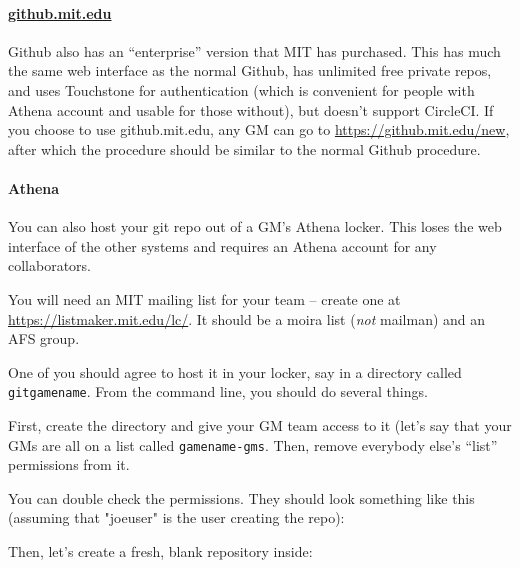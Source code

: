 \documentclass[green]{testgame}
\begin{document}
\paragraph*{\href{https://github.mit.edu}{github.mit.edu}} Github also has an ``enterprise'' version that MIT has purchased. This has much the same web interface as the normal Github, has unlimited free private repos, and uses Touchstone for authentication (which is convenient for people with Athena account and usable for those without), but doesn't support CircleCI. If you choose to use github.mit.edu, any GM can go to \url{https://github.mit.edu/new}, after which the procedure should be similar to the normal Github procedure.

\paragraph*{Athena} You can also host your git repo out of a GM's Athena locker. This loses the web interface of the other systems and requires an Athena account for any collaborators.

You will need an MIT mailing list for your team -- create one at \url{https://listmaker.mit.edu/lc/}.  It should be a moira list (\emph{not} mailman) and an AFS group.

One of you should agree to host it in your locker, say in a directory called \texttt{gitgamename}. From the command line, you should do several things.

First, create the directory and give your GM team access to it (let's
say that your GMs are all on a list called \texttt{gamename-gms}. Then,
remove everybody else's ``list'' permissions from it.


You can double check the permissions. They should look something like
this (assuming that "joeuser" is the user creating the repo):


Then, let's create a fresh, blank repository inside:
\end{document}
